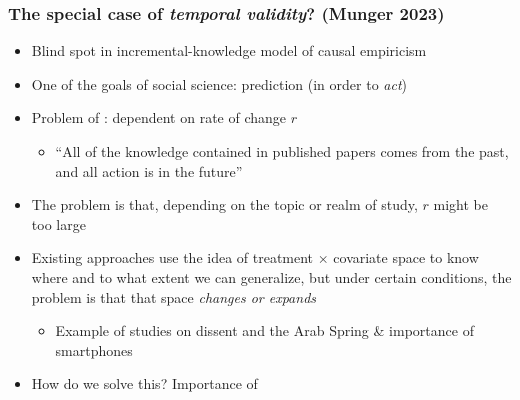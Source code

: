 \documentclass[aspectratio=43]{beamer}
\begin{document}
\begin{frame}
\frametitle{The special case of \textit{temporal validity}? (Munger 2023)}
\centering

\begin{itemize}
  \item Blind spot in incremental-knowledge model of causal empiricism
  \item<2-> One of the goals of social science: prediction (in order to \textit{act})
  \item<3-> Problem of : dependent on rate of change $r$
  \begin{itemize}
    \item ``All of the knowledge contained in published papers comes from the past, and all action is in the future''
  \end{itemize}
  \item<4-> The problem is that, depending on the topic or realm of study, $r$ might be too large
  \item<5-> Existing approaches use the idea of treatment $\times$ covariate space to know where and to what extent we can generalize, but under certain conditions, the problem is that that space \textit{changes or expands}
  \begin{itemize}
    \item Example of studies on dissent and the Arab Spring \& importance of smartphones
  \end{itemize}
  \item<6-> How do we solve this? Importance of 
\end{itemize}

\end{frame}
\end{document}
